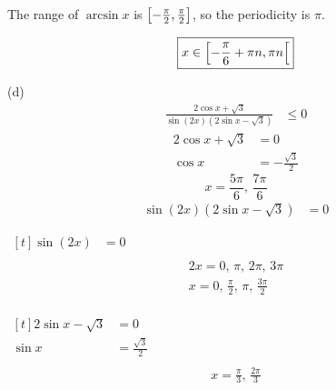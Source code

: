 \documentclass{article}
\begin{document}
\begin{itemize}
\begin{minipage}[t]{.45\textwidth}
	\flushleft
	The range of $\arcsin x$ is $\interval[scaled]
	{-\frac{\pi}{2}}{\frac{\pi}{2}}$, so the periodicity
	is $\pi$.
	\[
		\boxed{x\in\interval[scaled,open right]
		{-\frac{\pi}{6}+\pi n}{\pi n}}
	\]
\end{minipage}
\begin{minipage}[t]{.54\textwidth}
	\item[(d)]
		\begin{align*}
			\frac{2\cos x+\sqrt{3}}{\sin\left(2x\right)
				\left(2\sin x-\sqrt{3}\right)}&\leq0
		\end{align*}
		\begin{align*}
			2\cos x+\sqrt{3}&=0 \\
			\cos x&=-\frac{\sqrt{3}}{2}
		\end{align*}
		\[
			x=\frac{5\pi}{6},\,\frac{7\pi}{6}
		\]
		\begin{align*}
			\sin\left(2x\right)
				\left(2\sin x-\sqrt{3}\right)&=0
		\end{align*}
		\begin{minipage}[t]{.49\textwidth}
			$\begin{aligned}[t]
				\sin\left(2x\right)&=0 \\
			\end{aligned}$
			\begin{gather*}
				2x=0,\,\pi,\,2\pi,\,3\pi \\
				x=0,\,\frac{\pi}{2},\,\pi,\,\frac{3\pi}{2} \\
			\end{gather*}
		\end{minipage}
		\begin{minipage}[t]{.49\textwidth}
			$\begin{aligned}[t]
				2\sin x-\sqrt{3}&=0 \\
				\sin x&=\frac{\sqrt{3}}{2} \\
			\end{aligned}$
			\begin{gather*}
				x=\frac{\pi}{3},\,\frac{2\pi}{3} \\
			\end{gather*}
		\end{minipage}
	

\end{minipage}
\end{itemize}
\end{document}
